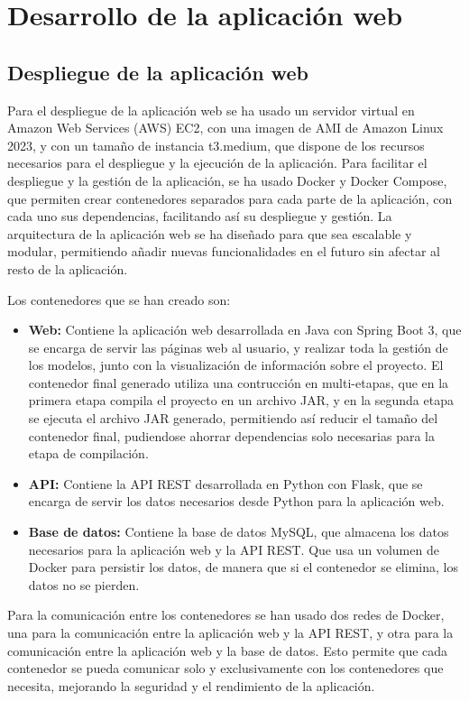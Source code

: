 \section{Desarrollo de la aplicación web}


\subsection{Despliegue de la aplicación web}
Para el despliegue de la aplicación web se ha usado un servidor virtual en Amazon Web Services (AWS) EC2, con una imagen de AMI de Amazon Linux 2023, y con un tamaño de instancia t3.medium, que dispone de los recursos necesarios para el despliegue y la ejecución de la aplicación.
Para facilitar el despliegue y la gestión de la aplicación, se ha usado Docker y Docker Compose, que permiten crear contenedores separados para cada parte de la aplicación, con cada uno sus dependencias, facilitando así su despliegue y gestión.
La arquitectura de la aplicación web se ha diseñado para que sea escalable y modular, permitiendo añadir nuevas funcionalidades en el futuro sin afectar al resto de la aplicación.

Los contenedores que se han creado son:
\begin{itemize}
    \item \textbf{Web:} Contiene la aplicación web desarrollada en Java con Spring Boot 3, que se encarga de servir las páginas web al usuario, y realizar toda la gestión de los modelos, junto con la visualización de información sobre el proyecto. El contenedor final generado utiliza una contrucción en multi-etapas, que en la primera etapa compila el proyecto en un archivo JAR, y en la segunda etapa se ejecuta el archivo JAR generado, permitiendo así reducir el tamaño del contenedor final, pudiendose ahorrar dependencias solo necesarias para la etapa de compilación.
    \item \textbf{API:} Contiene la API REST desarrollada en Python con Flask, que se encarga de servir los datos necesarios desde Python para la aplicación web.
    \item \textbf{Base de datos:} Contiene la base de datos MySQL, que almacena los datos necesarios para la aplicación web y la API REST. Que usa un volumen de Docker para persistir los datos, de manera que si el contenedor se elimina, los datos no se pierden.
\end{itemize}
Para la comunicación entre los contenedores se han usado dos redes de Docker, una para la comunicación entre la aplicación web y la API REST, y otra para la comunicación entre la aplicación web y la base de datos. Esto permite que cada contenedor se pueda comunicar solo y exclusivamente con los contenedores que necesita, mejorando la seguridad y el rendimiento de la aplicación.

